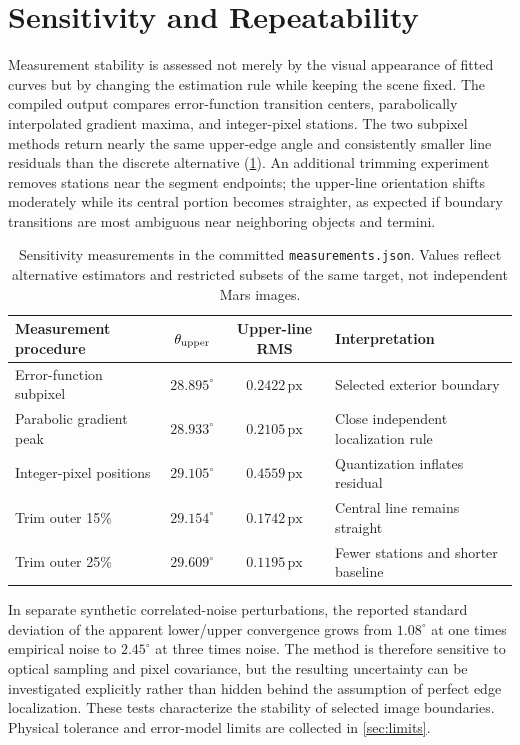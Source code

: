 \documentclass[11pt,letterpaper]{article}
\newcommand{\px}{\,\mathrm{px}}
\newcommand{\sourcepath}[1]{\nolinkurl{#1}}
\begin{document}
\section{Sensitivity and Repeatability}
\label{sec:sensitivity}

Measurement stability is assessed not merely by the visual appearance of fitted curves but by changing the estimation rule while keeping the scene fixed. The compiled output compares error-function transition centers, parabolically interpolated gradient maxima, and integer-pixel stations. The two subpixel methods return nearly the same upper-edge angle and consistently smaller line residuals than the discrete alternative (\cref{tab:sens}). An additional trimming experiment removes stations near the segment endpoints; the upper-line orientation shifts moderately while its central portion becomes straighter, as expected if boundary transitions are most ambiguous near neighboring objects and termini.

\begin{table}[ht]
\centering\small
\caption{Sensitivity measurements in the committed \sourcepath{measurements.json}. Values reflect alternative estimators and restricted subsets of the same target, not independent Mars images.}
\label{tab:sens}
\begin{tabularx}{\linewidth}{@{}l c c X@{}}
\toprule
\textbf{Measurement procedure} & \(\theta_{\rm upper}\) & \textbf{Upper-line RMS} & \textbf{Interpretation} \\
\midrule
Error-function subpixel & \(28.895^\circ\) & \(0.2422\px\) & Selected exterior boundary \\
Parabolic gradient peak & \(28.933^\circ\) & \(0.2105\px\) & Close independent localization rule \\
Integer-pixel positions & \(29.105^\circ\) & \(0.4559\px\) & Quantization inflates residual \\
Trim outer 15\% & \(29.154^\circ\) & \(0.1742\px\) & Central line remains straight \\
Trim outer 25\% & \(29.609^\circ\) & \(0.1195\px\) & Fewer stations and shorter baseline \\
\bottomrule
\end{tabularx}
\end{table}

In separate synthetic correlated-noise perturbations, the reported standard deviation of the apparent lower/upper convergence grows from \(1.08^\circ\) at one times empirical noise to \(2.45^\circ\) at three times noise. The method is therefore sensitive to optical sampling and pixel covariance, but the resulting uncertainty can be investigated explicitly rather than hidden behind the assumption of perfect edge localization. These tests characterize the stability of selected image boundaries. Physical tolerance and error-model limits are collected in \cref{sec:limits}.
\end{document}
